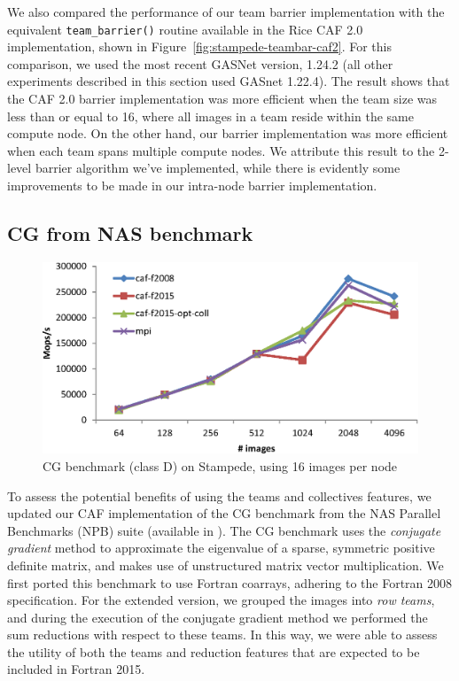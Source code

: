 We also compared the performance of our team barrier implementation with the
equivalent \texttt{team\_barrier()} routine available in the Rice CAF 2.0
implementation, shown in Figure~\ref{fig:stampede-teambar-caf2}.  For this
comparison, we used the most recent GASNet version, 1.24.2 (all other
experiments described in this section used GASnet 1.22.4).  The result shows
that the CAF 2.0 barrier implementation was more efficient when the team size
was less than or equal to 16, where all images in a team reside within the
same compute node. On the other hand, our barrier implementation was more
efficient when each team spans multiple compute nodes.  We attribute this
result to the 2-level barrier algorithm we've implemented, while there is
evidently some improvements to be made in our intra-node barrier
implementation.

\subsection{CG from NAS benchmark}
\begin{figure}[h]
\centering
\includegraphics[width=\columnwidth]{figures/stampede-caf-cg-D.eps}
\caption{CG benchmark (class D) on Stampede, using 16 images per node}
\label{fig:cg-stampede}
\end{figure}

To assess the potential benefits of using the teams and collectives features,
we updated our CAF implementation of the CG benchmark from the NAS Parallel
Benchmarks (NPB) suite (available in \cite{caf-testsuite}).
The CG benchmark uses the \textit{conjugate gradient} method to approximate
the eigenvalue of a sparse, symmetric positive definite matrix, and makes use
of unstructured matrix vector multiplication. We first ported this benchmark
to use Fortran coarrays, adhering to the Fortran 2008 specification. For the
extended version, we grouped the images into \textit{row teams}, and during
the execution of the conjugate gradient method we performed the sum reductions
with respect to these teams. In this way, we were able to assess the utility
of both the teams and reduction features that are expected to be included in
Fortran 2015.

